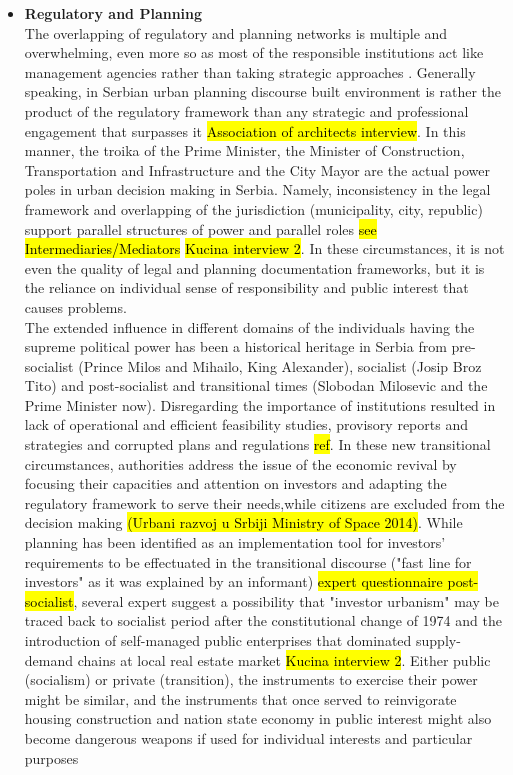 \documentclass[11pt]{report}
\begin{document}
\begin{itemize}
\item \textbf{Regulatory and Planning}
\\
The overlapping of regulatory and planning networks is multiple and overwhelming, even more so as most of the responsible institutions act like management agencies rather than taking strategic approaches \cite{Vujosevic 2012}.
Generally speaking, in Serbian urban planning discourse built environment is rather the product of the regulatory framework than any strategic and professional engagement that surpasses it \hl{Association of architects interview}. In this manner, the troika of the Prime Minister, the Minister of Construction, Transportation and Infrastructure and the City Mayor are the actual power poles in urban decision making in Serbia. Namely, inconsistency in the legal framework and overlapping of the jurisdiction (municipality, city, republic) support parallel structures of power and parallel roles \hl{see Intermediaries/Mediators} \hl{Kucina interview 2}.
In these circumstances, it is not even the quality of legal and planning documentation frameworks, but it is the reliance on individual sense of responsibility and public interest that causes problems.\footnotemark
{}
\\
The extended influence in different domains of the individuals having the supreme political power has been a historical heritage in Serbia from pre-socialist (Prince Milos and Mihailo, King Alexander), socialist (Josip Broz Tito) and post-socialist and transitional times (Slobodan Milosevic and the Prime Minister now).
Disregarding the importance of institutions resulted in lack of operational and efficient feasibility studies, 
provisory reports and strategies and corrupted plans and regulations \hl{ref}. In these new transitional circumstances, authorities address the issue of the economic revival by focusing their capacities and attention on investors and adapting the regulatory framework to serve their needs,\footnotemark while citizens are excluded from the decision making \hl{(Urbani razvoj u Srbiji Ministry of Space 2014)}.
While planning has been identified as an implementation tool for investors' requirements to be effectuated in the transitional discourse ("fast line for investors" as it was explained by an informant) \hl{expert questionnaire post-socialist}, several expert suggest a possibility that "investor urbanism" may be traced back to socialist period after the constitutional change of 1974 and the introduction of self-managed public enterprises that dominated supply-demand chains at local real estate market \hl{Kucina interview 2}. Either public (socialism) or private (transition), the instruments to exercise their power might be similar, and the instruments that once served to reinvigorate housing construction and nation state economy in public interest might also become dangerous weapons if used for individual interests and particular purposes

\end{itemize}
\end{document}
